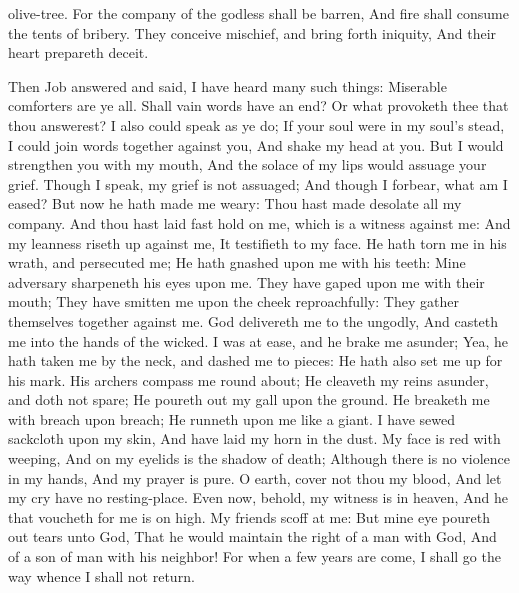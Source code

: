 olive-tree.  For the company of the godless shall be barren, And fire shall consume the tents of bribery.  They conceive mischief, and bring forth iniquity, And their heart prepareth deceit. 

Then Job answered and said,  I have heard many such things: Miserable comforters are ye all.  Shall vain words have an end? Or what provoketh thee that thou answerest?  I also could speak as ye do; If your soul were in my soul’s stead, I could join words together against you, And shake my head at you.  But I would strengthen you with my mouth, And the solace of my lips would assuage your grief.  Though I speak, my grief is not assuaged; And though I forbear, what am I eased?  But now he hath made me weary: Thou hast made desolate all my company.  And thou hast laid fast hold on me, which is a witness against me: And my leanness riseth up against me, It testifieth to my face.  He hath torn me in his wrath, and persecuted me; He hath gnashed upon me with his teeth: Mine adversary sharpeneth his eyes upon me.  They have gaped upon me with their mouth; They have smitten me upon the cheek reproachfully: They gather themselves together against me.  God delivereth me to the ungodly, And casteth me into the hands of the wicked.  I was at ease, and he brake me asunder; Yea, he hath taken me by the neck, and dashed me to pieces: He hath also set me up for his mark.  His archers compass me round about; He cleaveth my reins asunder, and doth not spare; He poureth out my gall upon the ground.  He breaketh me with breach upon breach; He runneth upon me like a giant.  I have sewed sackcloth upon my skin, And have laid my horn in the dust.  My face is red with weeping, And on my eyelids is the shadow of death;  Although there is no violence in my hands, And my prayer is pure.  O earth, cover not thou my blood, And let my cry have no resting-place.  Even now, behold, my witness is in heaven, And he that voucheth for me is on high.  My friends scoff at me: But mine eye poureth out tears unto God,  That he would maintain the right of a man with God, And of a son of man with his neighbor!  For when a few years are come, I shall go the way whence I shall not return. 


